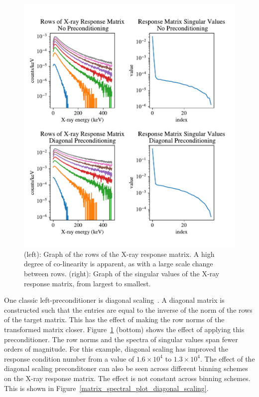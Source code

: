 \begin{figure}[p]
    \centering
    \includegraphics[width=\textwidth]{figures/chapter_4/matrix_spectral_plot/matrix_spectral_plot.pdf}
    \caption{(left): Graph of the rows of the X-ray response matrix. A high degree of co-linearity is apparent, as with a large scale change between rows. (right): Graph of the singular values of the X-ray response matrix, from largest to smallest. }
    \label{matrix_spectral_plot}
\end{figure}

One classic left-preconditioner is diagonal scaling~\citep{Pini1990}. A diagonal matrix is constructed such that the entries are equal to the inverse of the norm of the rows of the target matrix. This has the effect of making the row norms of the transformed matrix closer. Figure~\ref{matrix_spectral_plot} (bottom) shows the effect of applying this preconditioner. The row norms and the spectra of singular values span fewer orders of magnitude. For this example, diagonal scaling has improved the response condition number from a value of $1.6\times10^4$ to $1.3\times10^4$. The effect of the diagonal scaling preconditoner can also be seen across different binning schemes on the X-ray response matrix. The effect is not constant across binning schemes. This is shown in Figure~\ref{matrix_spectral_plot_diagonal_scaling}.

